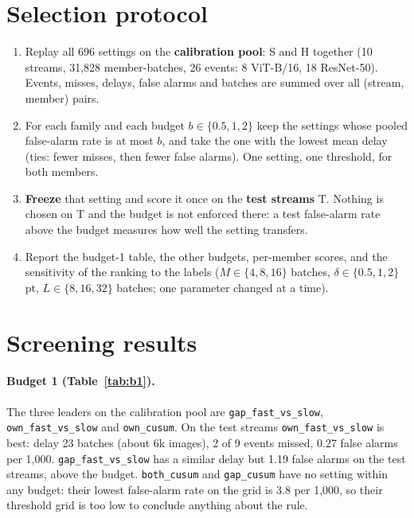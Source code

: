 \documentclass[10pt]{article}
\newcommand{\rl}[1]{\texttt{#1}}
\newcommand{\vit}{ViT-B/16}
\newcommand{\rn}{ResNet-50}
\begin{document}
\section{Selection protocol}
\begin{enumerate}
  \item Replay all 696 settings on the \textbf{calibration pool}: S and H together (10 streams, 31,828 member-batches, 26 events: 8 \vit{}, 18 \rn{}). Events, misses, delays, false alarms and batches are summed over all (stream, member) pairs.
  \item For each family and each budget $b \in \{0.5, 1, 2\}$ keep the settings whose pooled false-alarm rate is at most $b$, and take the one with the lowest mean delay (ties: fewer misses, then fewer false alarms). One setting, one threshold, for both members.
  \item \textbf{Freeze} that setting and score it once on the \textbf{test streams} T. Nothing is chosen on T and the budget is not enforced there: a test false-alarm rate above the budget measures how well the setting transfers.
  \item Report the budget-1 table, the other budgets, per-member scores, and the sensitivity of the ranking to the labels ($M \in \{4, 8, 16\}$ batches, $\delta \in \{0.5, 1, 2\}$ pt, $L \in \{8, 16, 32\}$ batches; one parameter changed at a time).
\end{enumerate}

\section{Screening results}
\paragraph{Budget 1 (Table~\ref{tab:b1}).} The three leaders on the calibration pool are \rl{gap\_fast\_vs\_slow}, \rl{own\_fast\_vs\_slow} and \rl{own\_cusum}. On the test streams \rl{own\_fast\_vs\_slow} is best: delay 23 batches (about 6k images), 2 of 9 events missed, 0.27 false alarms per 1,000.
\rl{gap\_fast\_vs\_slow} has a similar delay but 1.19 false alarms on the test streams, above the budget. \rl{both\_cusum} and \rl{gap\_cusum} have no setting within any budget: their lowest false-alarm rate on the grid is $3.8$ per 1,000, so their threshold grid is too low to conclude anything about the rule.
\end{document}
